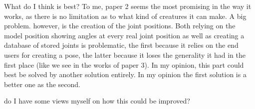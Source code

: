 \documentclass{article}
\begin{document}
What do I think is best?
To me, paper 2 seems the most promising in the way it works, as there is no
limitation as to what kind of creatures it can make. A big problem. however, is
the creation of the joint positions. Both relying on the model position showing
angles at every real joint position as well as creating a database of stored
joints is problematic, the first because it relies on the end users for creating
a pose, the latter because it loses the generality it had in the first place
(like we see in the works of paper 3). In my opinion, this part could best be
solved by another solution entirely. In my opinion the first solution is a
better one as the second.

do I have some views myself on how this could be improved?



\end{document}
